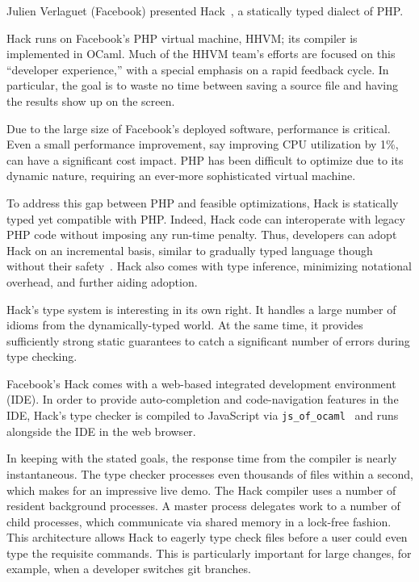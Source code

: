 \documentclass{jfp1}
\begin{document}

Julien Verlaguet (Facebook) presented Hack~\cite{Verlaguet:2014:Hack}, a
statically typed dialect of PHP.

Hack runs on Facebook's PHP virtual machine, HHVM; its compiler is
implemented in OCaml. Much of the HHVM team's efforts are focused on
this ``developer experience,'' with a special emphasis on a rapid
feedback cycle. In particular, the goal is to waste no time between
saving a source file and having the results show up on the screen.

Due to the large size of Facebook's deployed software, performance is
critical.  Even a small performance improvement, say improving CPU
utilization by 1\%, can have a significant cost impact. PHP has been
difficult to optimize due to its dynamic nature, requiring an
ever-more sophisticated virtual machine.

To address this gap between PHP and feasible optimizations, Hack is
statically typed yet compatible with PHP. Indeed, Hack code can
interoperate with legacy PHP code without imposing any run-time
penalty. Thus, developers can adopt Hack on an incremental
basis, similar to gradually typed language though without their
safety~\cite{st:gradual06,thf:dls06}. Hack also comes with type
inference, minimizing notational overhead, and further aiding
adoption.

Hack's type system is interesting in its own right. It handles a large
number of idioms from the dynamically-typed world. At the same time,
it provides sufficiently strong static guarantees to catch a
significant number of errors during type checking.

Facebook's Hack comes with a web-based integrated development environment
(IDE). In order to provide auto-completion and code-navigation features in
the IDE, Hack's type checker is compiled to JavaScript via
\texttt{js\_of\_ocaml}~\cite{DBLP:journals/spe/VouillonB14} and runs
alongside the IDE in the web browser.

In keeping with the stated goals, the response time from the compiler is
nearly instantaneous. The type checker processes even thousands of files
within a second, which makes for an impressive live demo.  The Hack
compiler uses a number of resident background processes. A master process
delegates work to a number of child processes, which communicate via
shared memory in a lock-free fashion. This architecture allows Hack to
eagerly type check files before a user could even type the requisite
commands. This is particularly important for large changes, for example,
when a developer switches git branches.
\end{document}
